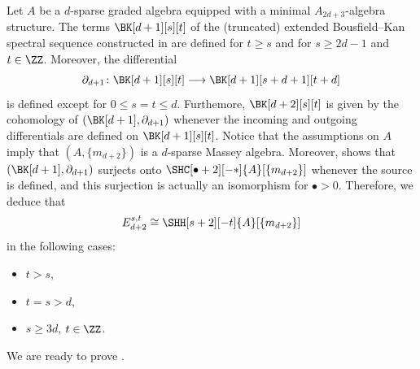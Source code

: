 \documentclass[a4paper]{amsart}
\begin{document}
\begin{remark}
  \label{rmk:BK_massey_algebra}
  Let $A$ be a $d$-sparse graded algebra equipped with a minimal $A_{2d+3}$-algebra structure.
  The terms $\BK[d+1][s][t]$ of the (truncated) extended Bousfield--Kan spectral sequence constructed in \cite{Mur20b} are defined for $t\geq s$ and for $s\geq 2d-1$ and $t\in\ZZ$. Moreover, the differential
  \[\partial_{d+1}\colon \BK[d+1][s][t]\longrightarrow \BK[d+1][s+d+1][t+d]\]
  is defined except for $0\leq s=t\leq d$. Furthemore, $\BK[d+2][s][t]$ is given
  by the cohomology of $(\BK[d+1],\partial_{d+1})$ whenever the incoming and
  outgoing differentials are defined on $\BK[d+1][s][t]$. Notice that the
  assumptions on $A$ imply that $(A,\{m_{d+2}\})$ is a $d$-sparse Massey algebra. Moreover,  shows that 
  $(\BK[d+1],\partial_{d+1})$ surjects onto $\SHC[\bullet+2][-*]{A}[\{m_{d+2}\}]$ whenever the source is defined, and this surjection is actually an isomorphism for $\bullet>0$. Therefore, we deduce that 
  \[E^{s,t}_{d+2}\cong\SHH[s+2][-t]{A}[\{m_{d+2}\}]\]
  in the following cases:
  \begin{itemize}
    \item $t>s$,
    \item $t=s>d$,
    \item $s\geq 3d$, $t\in\ZZ$.
  \end{itemize}
\end{remark}

We are ready to prove .
\end{document}
